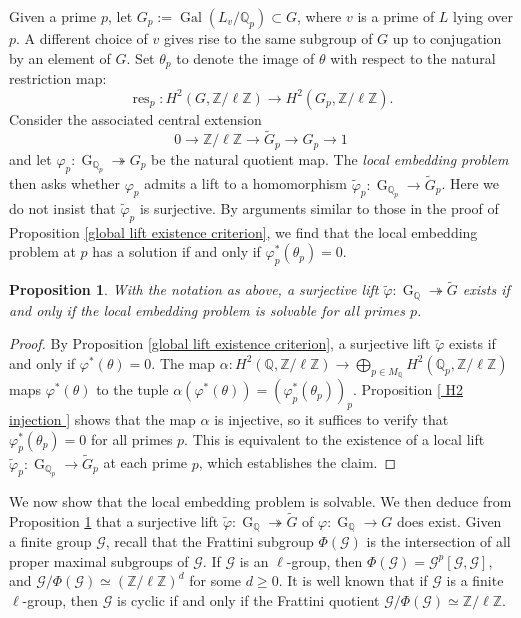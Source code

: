 \documentclass[11pt,reqno]{amsart}
\newtheorem{proposition}[theorem]{Proposition}
\newcommand{\cG}{\mathcal{G}}
\newcommand{\Z}{\mathbb{Z}}
\newcommand{\Q}{\mathbb{Q}}
\newcommand{\op}[1]{\operatorname{#1}}
\numberwithin{equation}{section}
\begin{document}
Given a prime $p$, let \( G_p := \operatorname{Gal}(L_v/\mathbb{Q}_p) \subset G \), where \( v \) is a prime of \( L \) lying over \( p \). A different choice of $v$ gives rise to the same subgroup of $G$ up to conjugation by an element of $G$. Set $\theta_p$ to denote the image of $\theta$ with respect to the natural restriction map: 
\[
\op{res}_p: H^2(G, \mathbb{Z}/\ell\mathbb{Z}) \to H^2(G_p, \mathbb{Z}/\ell\mathbb{Z}).
\]
Consider the associated central extension  
\begin{equation}\label{local embedding problem}
0 \to \mathbb{Z}/\ell\mathbb{Z} \to \widetilde{G}_p \to G_p \to 1
\end{equation}
and let \( \varphi_p: \operatorname{G}_{\mathbb{Q}_p} \twoheadrightarrow G_p \) be the natural quotient map. The \emph{local embedding problem} then asks whether \( \varphi_p \) admits a lift to a homomorphism \( \widetilde{\varphi}_p: \operatorname{G}_{\mathbb{Q}_p} \rightarrow \widetilde{G}_p \). Here we do not insist that $\widetilde{\varphi}_p$ is surjective. By arguments similar to those in the proof of Proposition \ref{global lift existence criterion}, we find that the local embedding problem at $p$ has a solution if and only if $\varphi_p^*(\theta_p)=0$.

\begin{proposition}\label{local global propn}  
    With the notation as above, a surjective lift \(\widetilde{\varphi}: \op{G}_{\Q} \twoheadrightarrow \widetilde{G}\) exists if and only if the local embedding problem is solvable for all primes \( p \).  
\end{proposition}  

\begin{proof}  
By Proposition \ref{global lift existence criterion}, a surjective lift \(\widetilde{\varphi}\) exists if and only if \(\varphi^*(\theta) = 0\). The map $\alpha: H^2(\Q, \Z/\ell\Z)\rightarrow \bigoplus_{p\in M_{\Q}} H^2(\Q_p, \Z/\ell\Z)$ maps $\varphi^*(\theta)$ to the tuple $\alpha(\varphi^*(\theta))=\left(\varphi_p^*(\theta_p)\right)_p$. Proposition \ref{ H2 injection } shows that the map \(\alpha\) is injective, so it suffices to verify that \(\varphi_p^*(\theta_p) = 0\) for all primes \( p \). This is equivalent to the existence of a local lift \(\widetilde{\varphi}_p: \op{G}_{\Q_p} \to \widetilde{G}_p\) at each prime \( p \), which establishes the claim.  
\end{proof}  


We now show that the local embedding problem is solvable. We then deduce from Proposition \ref{local global propn} that a surjective lift $\widetilde{\varphi}: \op{G}_{\Q}\twoheadrightarrow \widetilde{G}$ of $\varphi: \op{G}_{\Q}\rightarrow G$ does exist. Given a finite group $\cG$, recall that the Frattini subgroup $\Phi(\cG)$ is the intersection of all proper maximal subgroups of $\cG$. If $\cG$ is an $\ell$-group, then $\Phi(\cG)=\cG^p[\cG, \cG]$, and $\cG/\Phi(\cG)\simeq (\Z/\ell\Z)^d$ for some $d\geq 0$. It is well known that if $\cG$ is a finite $\ell$-group, then $\cG$ is cyclic if and only if the Frattini quotient $\cG/\Phi(\cG)\simeq \Z/\ell\Z$. 
\end{document}
